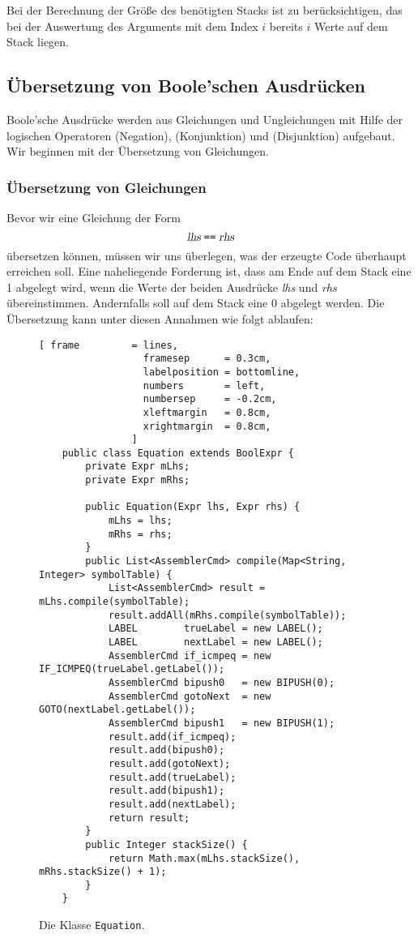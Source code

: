 Bei der Berechnung der Gr\"o{\ss}e des ben\"otigten Stacks ist zu ber\"ucksichtigen, das bei der Auswertung
des Arguments mit dem Index $i$ bereits $i$ Werte auf dem Stack liegen.
\pagebreak


\subsection{\"Ubersetzung von Boole'schen Ausdr\"ucken}
Boole'sche Ausdr\"ucke werden aus Gleichungen und Ungleichungen mit Hilfe der logischen Operatoren
\qote{!} (Negation), \qote{\&\&} (Konjunktion) und \qote{||} (Disjunktion) aufgebaut.
Wir beginnen mit der \"Ubersetzung von Gleichungen.

\subsubsection{\"Ubersetzung von Gleichungen}
Bevor wir eine Gleichung der Form
\[ \textsl{lhs}\; \texttt{==} \;\textsl{rhs} \]
\"ubersetzen k\"onnen, m\"ussen wir uns \"uberlegen, was der erzeugte Code \"uberhaupt erreichen soll.  Eine
naheliegende Forderung ist, dass am Ende auf dem Stack eine 1 abgelegt wird, wenn die Werte der
beiden Ausdr\"ucke \textsl{lhs} und \textsl{rhs} \"ubereinstimmen.  Andernfalls soll auf dem Stack eine
0 abgelegt werden.  Die \"Ubersetzung kann unter diesen Annahmen wie folgt ablaufen:


\begin{figure}[!ht]
\centering
\begin{Verbatim}[ frame         = lines, 
                  framesep      = 0.3cm, 
                  labelposition = bottomline,
                  numbers       = left,
                  numbersep     = -0.2cm,
                  xleftmargin   = 0.8cm,
                  xrightmargin  = 0.8cm,
                ]
    public class Equation extends BoolExpr {
        private Expr mLhs;
        private Expr mRhs;
    
        public Equation(Expr lhs, Expr rhs) {
            mLhs = lhs;
            mRhs = rhs;
        }
        public List<AssemblerCmd> compile(Map<String, Integer> symbolTable) {
            List<AssemblerCmd> result = mLhs.compile(symbolTable);
            result.addAll(mRhs.compile(symbolTable));
            LABEL        trueLabel = new LABEL();
            LABEL        nextLabel = new LABEL();
            AssemblerCmd if_icmpeq = new IF_ICMPEQ(trueLabel.getLabel());
            AssemblerCmd bipush0   = new BIPUSH(0);
            AssemblerCmd gotoNext  = new GOTO(nextLabel.getLabel());
            AssemblerCmd bipush1   = new BIPUSH(1);
            result.add(if_icmpeq);
            result.add(bipush0);
            result.add(gotoNext);
            result.add(trueLabel);
            result.add(bipush1);
            result.add(nextLabel);
            return result;
        }
        public Integer stackSize() {
            return Math.max(mLhs.stackSize(), mRhs.stackSize() + 1);
        }
    }
\end{Verbatim}
\vspace*{-0.3cm}
\caption{Die Klasse \texttt{Equation}.}
\label{fig:Expr:Equation.java}
\end{figure}

